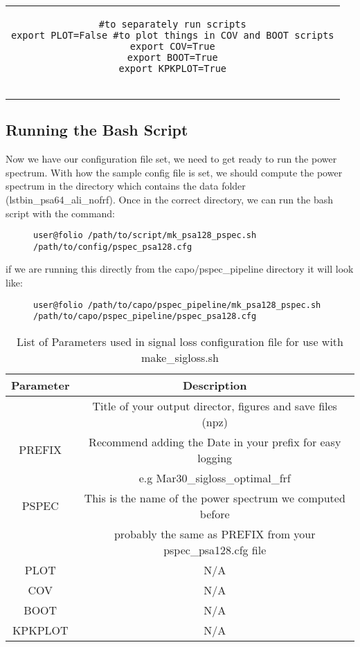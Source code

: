 \documentclass[onecolumn]{emulateapj}
\begin{document}
{{\begin{tabular}{c}
\begin{lstlisting}[name='pspec_psa128.cfg']
#to separately run scripts
export PLOT=False #to plot things in COV and BOOT scripts
export COV=True
export BOOT=True
export KPKPLOT=True


\end{lstlisting}
\end{tabular}
}
\subsection{Running the Bash Script}{
Now we have our configuration file set, we need to get ready to run the power spectrum. With how the sample config file is set, we should compute the power spectrum in the directory which contains the data folder (lstbin\_psa64\_ali\_nofrf). Once in the correct directory, we can run the bash script with the command:

\begin{figure}[h!]
\centering
\begin{lstlisting}[numbers=none]
user@folio /path/to/script/mk_psa128_pspec.sh /path/to/config/pspec_psa128.cfg
\end{lstlisting}
\end{figure}


if we are running this directly from the capo/pspec\_pipeline directory it will look like:
\begin{figure}[h!]
\centering
\begin{lstlisting}[numbers=none]
user@folio /path/to/capo/pspec_pipeline/mk_psa128_pspec.sh /path/to/capo/pspec_pipeline/pspec_psa128.cfg
\end{lstlisting}
\end{figure}
}
}


\begin{table}[ht]
\centering
\begin{tabular}{c | c}
Parameter & Description \\ \hline \hline
     &  Title of your output director, figures and save files (npz)  \tabularnewline
PREFIX & Recommend adding the Date in your prefix for easy logging \tabularnewline
     & e.g Mar30\_sigloss\_optimal\_frf \tabularnewline \hline
PSPEC & This is the name of the power spectrum we computed before\tabularnewline
	 & probably the same as PREFIX from your pspec\_psa128.cfg file\tabularnewline \hline
 PLOT & N/A\tabularnewline \hline
COV  &  N/A \tabularnewline \hline
BOOT &  N/A \tabularnewline \hline
KPKPLOT & N/A\tabularnewline
\end{tabular}
\caption{\label{tab:sig_parms}List of Parameters used in signal loss configuration file for use with make\_sigloss.sh}
\end{table}
\end{document}
